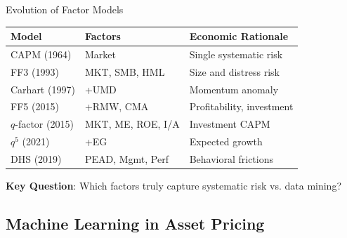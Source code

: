 \documentclass{beamer}
\begin{document}
\begin{frame}{Evolution of Factor Models}
\small{
\begin{tabular}{p{2.2cm}p{3cm}p{4.5cm}}
	\toprule
	\textbf{Model} & \textbf{Factors} & \textbf{Economic Rationale} \\
	\midrule
	CAPM (1964) & Market & Single systematic risk \\
	\hline
	FF3 (1993) & MKT, SMB, HML & Size and distress risk \\
	\hline
	Carhart (1997) & +UMD & Momentum anomaly \\
	\hline
	FF5 (2015) & +RMW, CMA & Profitability, investment \\
	\hline
	$q$-factor (2015) & MKT, ME, ROE, I/A & Investment CAPM \\
	\hline
	$q^5$ (2021) & +EG & Expected growth \\
	\hline
	DHS (2019) & PEAD, Mgmt, Perf & Behavioral frictions \\
	\bottomrule
\end{tabular}
}

\vspace{10pt}
\textbf{Key Question}: Which factors truly capture systematic risk vs. data mining?
\end{frame}

\subsection{Machine Learning in Asset Pricing}
\end{document}
